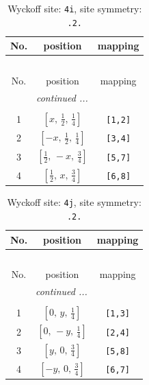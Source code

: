 \documentclass[fleqn,8pt]{jsarticle}
\begin{document}
\renewcommand{\arraystretch}{1.2}
\begin{longtable}{ccc}
\caption{Wyckoff site: {\tt 4i}, site symmetry: {\tt .2.}}
 \\
 \hline \hline
No. & position & mapping \\ \hline \endfirsthead

\multicolumn{2}{l}{\tablename\ \thetable{}} \\
 \hline \hline
No. & position & mapping \\ \hline \endhead

 \hline \hline
\multicolumn{2}{r}{\footnotesize\it continued ...} \\ \endfoot

 \hline \hline
\multicolumn{2}{r}{} \\ \endlastfoot

1 & $\left[ x,\, \frac{1}{2},\, \frac{1}{4} \right]$ & {\tt [1,2]} \\ \hline
2 & $\left[ - x,\, \frac{1}{2},\, \frac{1}{4} \right]$ & {\tt [3,4]} \\ \hline
3 & $\left[ \frac{1}{2},\, - x,\, \frac{3}{4} \right]$ & {\tt [5,7]} \\ \hline
4 & $\left[ \frac{1}{2},\, x,\, \frac{3}{4} \right]$ & {\tt [6,8]} \\
\end{longtable}
\renewcommand{\arraystretch}{1.2}
\begin{longtable}{ccc}
\caption{Wyckoff site: {\tt 4j}, site symmetry: {\tt .2.}}
 \\
 \hline \hline
No. & position & mapping \\ \hline \endfirsthead

\multicolumn{2}{l}{\tablename\ \thetable{}} \\
 \hline \hline
No. & position & mapping \\ \hline \endhead

 \hline \hline
\multicolumn{2}{r}{\footnotesize\it continued ...} \\ \endfoot

 \hline \hline
\multicolumn{2}{r}{} \\ \endlastfoot

1 & $\left[ 0,\, y,\, \frac{1}{4} \right]$ & {\tt [1,3]} \\ \hline
2 & $\left[ 0,\, - y,\, \frac{1}{4} \right]$ & {\tt [2,4]} \\ \hline
3 & $\left[ y,\, 0,\, \frac{3}{4} \right]$ & {\tt [5,8]} \\ \hline
4 & $\left[ - y,\, 0,\, \frac{3}{4} \right]$ & {\tt [6,7]} \\
\end{longtable}
\end{document}
